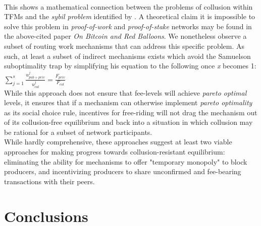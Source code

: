 \documentclass[11pt,a4paper]{llncs}
\begin{document}
\vspace{0.2cm} \\
This shows a mathematical connection between the problems of collusion within TFMs and the \textit{sybil problem} identified by \cite{babaioffredballoons}. A theoretical claim it is impossible to solve this problem in \textit{proof-of-work} and \textit{proof-of-stake} networks may be found in the above-cited paper \textit{On Bitcoin and Red Balloons}. We nonetheless observe a subset of routing work mechanisms that can address this specific problem. As such, at least a subset of indirect mechanisms exists which avoid the Samuelson suboptimality trap by simplifying his equation to the following once \textit{x} becomes 1:
\vspace{0.2cm} \\
\LARGE
\begin{math}
\sum_{j=1}^{s} \frac{u_{{pub}+{priv}}^j}{u_{col}^j} = \frac{F_{{priv}}}{F_{col}}
\end{math}
\normalsize
\vspace{0.2cm} \\
While this approach does not ensure that fee-levels will achieve \textit{pareto optimal} levels, it ensures that if a mechanism can otherwise implement \textit{pareto optimality} as its social choice rule, incentives for free-riding will not drag the mechanism out of its collusion-free equilibrium and back into a situation in which collusion may be rational for a subset of network participants.
\vspace{0.2cm} \\
While hardly comprehensive, these approaches suggest at least two viable approaches for making progress towards collusion-resistant equilibrium: eliminating the ability for mechanisms to offer "temporary monopoly" to block producers, and incentivizing producers to share unconfirmed and fee-bearing transactions with their peers.


\section*{Conclusions}
\end{document}
